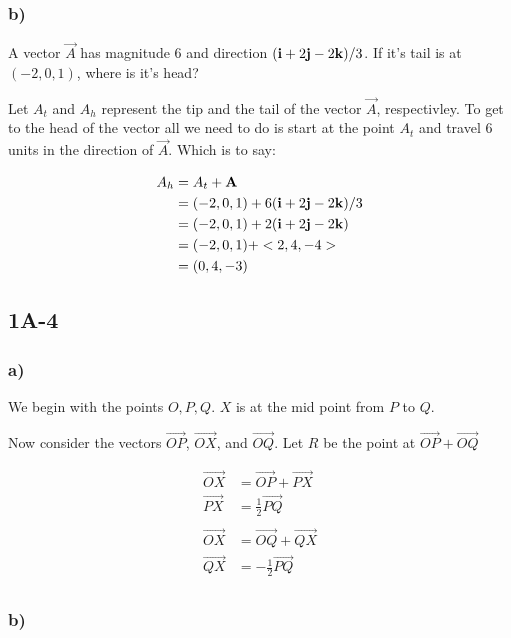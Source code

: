 \documentclass[main.tex]{subfiles}
\begin{document}
\subsubsection*{b)}
    A vector $\vec{A}$ has magnitude 6 and
    direction $(\mathbf{i} + 2\mathbf{j} - 2\mathbf{k})/3$. If it's tail is at $(-2, 0 , 1)$,
    where is it's head?

    Let $A_t$ and $A_h$ represent the tip and the tail of the vector
    $\vec{A}$, respectivley.
    To get to the head of the vector all we need to do is start at the
    point $A_t$ and travel 6 units in the direction of $\vec{A}$.
    Which is to say:

    \begin{align*}
    A_h &= A_t + \mathbf{A}\\
    &= (-2,0,1) + 6(\mathbf{i} + 2\mathbf{j} - 2\mathbf{k})/3\\
    &= (-2,0,1) + 2(\mathbf{i} + 2\mathbf{j} - 2\mathbf{k})\\
    &= (-2,0,1) + <2,4, -4>\\
    &= (0,4,-3)\\
    \end{align*}

\subsection*{1A-4}

\subsubsection*{a)}

We begin with the points $O, P, Q$. $X$ is at the mid point from $P$
to $Q$.

Now consider the vectors $\vec{OP}$, $\vec{OX}$, and $\vec{OQ}$.
Let $R$ be the point at $\vec{OP} + \vec{OQ}$

\begin{align*}
\vec{OX} &= \vec{OP} + \vec{PX} \\
\vec{PX} &= \frac{1}{2}\vec{PQ} \\
\\
\vec{OX} &= \vec{OQ} + \vec{QX}\\
\vec{QX} &= -\frac{1}{2}\vec{PQ} \\
\end{align*}


\subsubsection*{b)}
\end{document}
